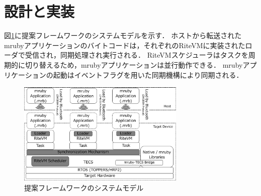 \documentclass[submit,techrep]{ipsj}
\begin{document}
%
%
%
\vspace{-2mm}
\section{設計と実装}
\vspace{-2mm}
\label{sec:Design and Implementation}
図\ref{fig:system_model}に提案フレームワークのシステムモデルを示す．
ホストから転送されたmrubyアプリケーションのバイトコードは，それぞれのRiteVMに実装されたローダで受信され，同期処理され実行される．
RiteVMスケジューラはタスクを周期的に切り替えるため，mrubyアプリケーションは並行動作できる．
mrubyアプリケーションの起動はイベントフラグを用いた同期機構により同期される．　
\begin{figure}[t]
    \centering
    \includegraphics[width=8cm,clip]{../EMSOFT2016/figure/system_model.pdf}
    \vspace{-2mm}
    \caption{提案フレームワークのシステムモデル}
\vspace{-3mm}
    \label{fig:system_model}
\end{figure}
\vspace{-3mm}
\end{document}
